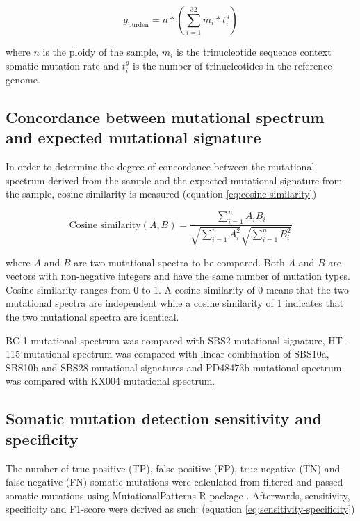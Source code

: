 \begin{equation} \label{eq:mutation-burden-per-cell}
g_{\text{burden}} = n * (\sum^{32}_{i=1} m_{i} * t^{g}_{i})
\end{equation}

where $n$ is the ploidy of the sample, $m_{i}$ is the trinucleotide sequence context somatic mutation rate and $t^{g}_{i}$ is the number of trinucleotides in the reference genome.

\subsection{Concordance between mutational spectrum and expected mutational signature}

In order to determine the degree of concordance between the mutational spectrum derived from the sample and the expected mutational signature from the sample, cosine similarity is measured (equation \ref{eq:cosine-similarity})

\begin{equation} 
\label{eq:cosine-similarity}
\text{Cosine similarity} (A,B) = \frac{\sum^{n}_{i=1}A_{i}B_{i}}{\sqrt{\sum^{n}_{i=1}A^{2}_{i}}\sqrt{\sum^{n}_{i=1}B^{2}_{i}}}
\end{equation}

where $A$ and $B$ are two mutational spectra to be compared. Both $A$ and $B$ are vectors with non-negative integers and have the same number of mutation types. Cosine similarity ranges from 0 to 1. A cosine similarity of 0 means that the two mutational spectra are independent while a cosine similarity of 1 indicates that the two mutational spectra are identical. 

BC-1 mutational spectrum was compared with SBS2 mutational signature, HT-115 mutational spectrum was compared with linear combination of SBS10a, SBS10b and SBS28 mutational signatures and PD48473b mutational spectrum was compared with KX004 mutational spectrum.

\subsection{Somatic mutation detection sensitivity and specificity}

The number of true positive (TP), false positive (FP), true negative (TN) and false negative (FN) somatic mutations were calculated from filtered and passed somatic mutations using MutationalPatterns R package \cite{Blokzijl2018-jo}. Afterwards, sensitivity, specificity and F1-score were derived as such: (equation \ref{eq:sensitivity-specificity})

